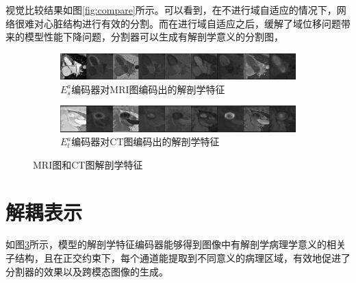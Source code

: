 视觉比较结果如图\ref{fig:compare}所示。可以看到，在不进行域自适应的情况下，网络很难对心脏结构进行有效的分割。而在进行域自适应之后，缓解了域位移问题带来的模型性能下降问题，分割器可以生成有解剖学意义的分割图，
\begin{figure}
    \centering
    \begin{subfigure}{\textwidth}
        \includegraphics[width=1\textwidth]{image/chap04/attn_A.jpeg}
        \caption{$E_s^a$编码器对MRI图编码出的解剖学特征}
        \label{fig:attnA}
    \end{subfigure}
    \vfill
    \begin{subfigure}{\textwidth}
        \includegraphics[width=1\textwidth]{image/chap04/attn_B.jpeg}
        \caption{$E_t^a$编码器对CT图编码出的解剖学特征}
        \label{fig:attnB}
    \end{subfigure}
    \caption{MRI图和CT图解剖学特征}
    \label{fig:attn}
    \end{figure}

\section{解耦表示}
如图\ref{fig:attn}所示，模型的解剖学特征编码器能够得到图像中有解剖学病理学意义的相关子结构，且在正交约束下，每个通道能提取到不同意义的病理区域，有效地促进了分割器的效果以及跨模态图像的生成。


